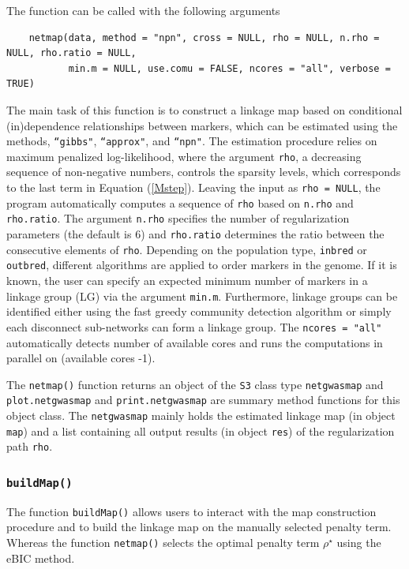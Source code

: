 The function can be called with the following arguments
\begin{verbatim}
	netmap(data, method = "npn", cross = NULL, rho = NULL, n.rho = NULL, rho.ratio = NULL, 
	       min.m = NULL, use.comu = FALSE, ncores = "all", verbose = TRUE)
\end{verbatim}
The main task of this function is to construct a linkage map based on conditional (in)dependence relationships between markers, which can be estimated using the methods, {\tt ``gibbs"}, {\tt``approx"}, and {\tt``npn"}. The estimation procedure relies on maximum penalized log-likelihood, where the argument {\tt rho}, a decreasing sequence of non-negative numbers, controls the sparsity levels, which corresponds to the last term in Equation (\ref{Mstep}). Leaving the input as {\tt rho = NULL}, the program automatically computes a sequence of {\tt rho} based on {\tt n.rho} and {\tt rho.ratio}. The argument {\tt n.rho} specifies the number of regularization parameters (the default is 6) and {\tt rho.ratio} determines the ratio between the consecutive elements of {\tt rho}. Depending on the population type, {\tt inbred} or {\tt outbred}, different algorithms are applied to order markers in the genome. If it is known, the user can specify an expected minimum number of markers in a linkage group (LG) via the argument {\tt min.m}. Furthermore, linkage groups can be identified either using the fast greedy community detection algorithm \citep{newman2004fast} or simply each disconnect sub-networks can form a linkage group. The {\tt ncores = "all"} automatically detects number of available cores and runs the computations in parallel on (available cores -1).

The {\tt netmap()} function returns an object of the {\tt S3} class type {\tt netgwasmap} and {\tt plot.netgwasmap} and {\tt print.netgwasmap} are summary method functions for this object class. 
The {\tt netgwasmap} mainly holds the estimated linkage map (in object {\tt map}) and a list containing all output results (in object {\tt res}) of the regularization path {\tt rho}. 
 


\subsubsection{\textbf{{\tt buildMap()}}}
The function {\tt buildMap()} allows users to interact with the map construction procedure and to build the linkage map on the manually selected penalty term. Whereas the function {\tt netmap()} selects the optimal penalty term $\rho^\star$ using the eBIC method.


